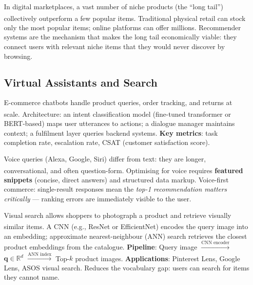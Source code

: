 \begin{tcbitemize}[ skin=sectionraster ]
    \tcbitem[title=The Long Tail, raster multicolumn=3]
    In digital marketplaces, a vast number of niche products (the ``long tail'') collectively outperform a few popular items\textsuperscript{\cite[][pp.~3--8]{leskovecMiningMassiveDatasets2014}}.
    Traditional physical retail can stock only the most popular items; online platforms can offer millions.
    Recommender systems are the mechanism that makes the long tail economically viable: they connect users with relevant niche items that they would never discover by browsing.

\end{tcbitemize}

\subsection{Virtual Assistants and Search}

\begin{tcbitemize}[ skin=sectionraster ]

    \tcbitem[title={NLP-Powered Chatbots}, raster multicolumn=3]
    E-commerce chatbots handle product queries, order tracking, and returns at scale\textsuperscript{\cite[][pp.~150--155]{chaffeyDigitalBusinessECommerce2019}}.
    Architecture: an intent classification model (fine-tuned transformer or BERT-based) maps user utterances to actions; a dialogue manager maintains context; a fulfilment layer queries backend systems.
    \textbf{Key metrics}: task completion rate, escalation rate, CSAT (customer satisfaction score).

    \tcbitem[title={Voice Search}, raster multicolumn=3]
    Voice queries (Alexa, Google, Siri) differ from text: they are longer, conversational, and often question-form\textsuperscript{\cite[][pp.~155--158]{chaffeyDigitalBusinessECommerce2019}}.
    Optimising for voice requires \textbf{featured snippets} (concise, direct answers) and structured data markup.
    Voice-first commerce: single-result responses mean the \emph{top-1 recommendation matters critically} --- ranking errors are immediately visible to the user.

    \tcbitem[title={Visual Product Search}, raster multicolumn=6]
    Visual search allows shoppers to photograph a product and retrieve visually similar items\textsuperscript{\cite[][pp.~160--163]{chaffeyDigitalBusinessECommerce2019}}.
    A CNN (e.g., ResNet or EfficientNet) encodes the query image into an embedding; approximate nearest-neighbour (ANN) search retrieves the closest product embeddings from the catalogue.
    \tcblower
    \textbf{Pipeline}: Query image $\xrightarrow{\text{CNN encoder}}$ $\mathbf{q} \in \mathbb{R}^d$ $\xrightarrow{\text{ANN index}}$ Top-$k$ product images.
    \textbf{Applications}: Pinterest Lens, Google Lens, ASOS visual search. Reduces the vocabulary gap: users can search for items they cannot name.

\end{tcbitemize}

